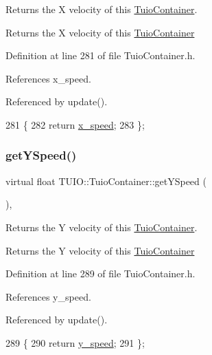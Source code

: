 Returns the X velocity of this \hyperlink{class_t_u_i_o_1_1_tuio_container}{Tuio\+Container}. \begin{DoxyReturn}{Returns}
the X velocity of this \hyperlink{class_t_u_i_o_1_1_tuio_container}{Tuio\+Container} 
\end{DoxyReturn}


Definition at line 281 of file Tuio\+Container.\+h.



References x\+\_\+speed.



Referenced by update().


\begin{DoxyCode}
281                                   \{ 
282             \textcolor{keywordflow}{return} \hyperlink{class_t_u_i_o_1_1_tuio_container_a5ee28d0495d5cc4fa331ed0b14b9e176}{x\_speed};
283         \};
\end{DoxyCode}
\mbox{\label{class_t_u_i_o_1_1_tuio_container_a2a7eb2f2a52fff82a36e818c61e76362}} 
\subsubsection{\texorpdfstring{get\+Y\+Speed()}{getYSpeed()}}
{\footnotesize\ttfamily virtual float T\+U\+I\+O\+::\+Tuio\+Container\+::get\+Y\+Speed (\begin{DoxyParamCaption}{ }\end{DoxyParamCaption})\hspace{0.3cm}{\ttfamily [inline]}, {\ttfamily [virtual]}}

Returns the Y velocity of this \hyperlink{class_t_u_i_o_1_1_tuio_container}{Tuio\+Container}. \begin{DoxyReturn}{Returns}
the Y velocity of this \hyperlink{class_t_u_i_o_1_1_tuio_container}{Tuio\+Container} 
\end{DoxyReturn}


Definition at line 289 of file Tuio\+Container.\+h.



References y\+\_\+speed.



Referenced by update().


\begin{DoxyCode}
289                                   \{ 
290             \textcolor{keywordflow}{return} \hyperlink{class_t_u_i_o_1_1_tuio_container_a2499ba8d5c0d8ca4afc3b55ddff4ff1a}{y\_speed};
291         \};
\end{DoxyCode}
\mbox{\label{class_t_u_i_o_1_1_tuio_container_aa82c3733bc23cebe685ba73c7dc91df3}} 
